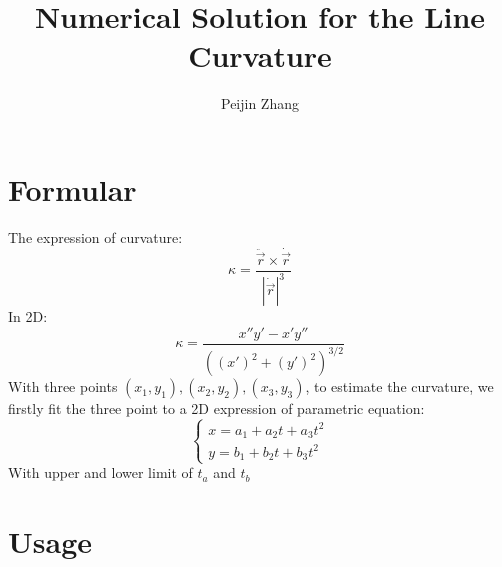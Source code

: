 \documentclass{article}
\title{Numerical Solution for the Line Curvature}
\author{Peijin Zhang}
\begin{document}
	\maketitle
	\section{Formular}
	The expression of curvature:
	\begin{equation}
	\kappa = \frac{\ddot{\vec{r}}\times\dot{\vec{r}}}{\left| \dot{\vec{r}}\right|^3}
	\end{equation}
	In 2D:
	\begin{equation}
	\kappa = \frac{x''y'-x'y''}{\left( (x')^2+(y')^2\right)^{3/2}}
	\end{equation}
	With three points $(x_1,y_1), (x_2,y_2), (x_3,y_3)$, to estimate the curvature, we firstly fit the three point to a 2D expression of parametric equation:
	\begin{equation}
	\left\{ \begin{matrix} x = a_1 +a_2 t+a_3 t^2\\ y= b_1 +b_2 t+b_3 t^2 \end{matrix} \right.
	\end{equation}
	With upper and lower limit of $t_a$ and $t_b$
	
	\section{Usage}
\end{document}
